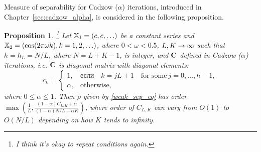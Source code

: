 \documentclass[sii]{ipart}
\newtheorem{proposition}{Proposition}
\begin{document}
Measure of separability for Cadzow ($\alpha$) iterations, introduced in Chapter~\ref{sec:cadzow_alpha}, is considered in the following proposition.

\begin{proposition}
	\label{prop:separ1} \footnote{I think it's okay to repeat conditions again.}
	Let $\mathbb{X}_1 = (c, c, \ldots)$ be a constant series and $\mathbb{X}_2 = (\cos(2 \pi \omega k), k = 1, 2, \ldots)$, where $0<\omega <0.5$, $L,K\rightarrow \infty$ such that $h = h_L = N/L$, where $N=L+K-1$, is integer, and $\mathbf{C}$ defined in Cadzow ($\alpha$) iterations, i.e.  $\mathbf{C}$ is diagonal matrix with diagonal elements:
	\begin{equation*}
	c_k = \begin{cases}
	1, & \text{если} \quad k = jL+1 \quad \text{for some} \ j = 0, \ldots, h-1,\\
	\alpha, & \text{otherwise},
	\end{cases}
	\end{equation*}
	where $0 \le \alpha \le 1$. Then $\rho$ given by \eqref{weak_sep_eq} has order $\max(\frac{1}{L}, \frac{(1-\alpha)C_{L,K}+\alpha}{(1-\alpha)N/L+\alpha K})$, where order of $C_{L,K}$
	can vary from $O(1)$ to $O(N/L)$ depending on how $K$ tends to infinity.
\end{proposition}
\end{document}
